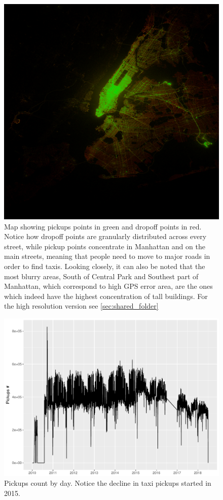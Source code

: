 \documentclass{acm_proc_article-sp-sigmod09}
\begin{document}
\begin{figure}
	\centering
	\includegraphics[width=1\columnwidth]{resources/base_plots/pickup_vs_dropoff.png}
	\caption{Map showing pickups points in green and dropoff points in red. Notice how dropoff points are granularly distributed across every street, while pickup points concentrate in Manhattan and on the main streets, meaning that people need to move to major roads in order to find taxis. Looking closely, it can also be noted that the most blurry areas, South of Central Park and Southest part of Manhattan, which correspond to high GPS error area, are the ones which indeed have the highest concentration of tall buildings. For the high resolution version see \cref{sec:shared_folder}}
	\label{fig:pickupDropoffImageMap}
\end{figure}

\begin{figure}
	\centering
	\includegraphics[width=1\columnwidth]{resources/base_plots/overall_pickups.pdf}
	\caption{Pickups count by day. Notice the decline in taxi pickups started in 2015.}
	\label{fig:overallPickups}
\end{figure}
\end{document}
